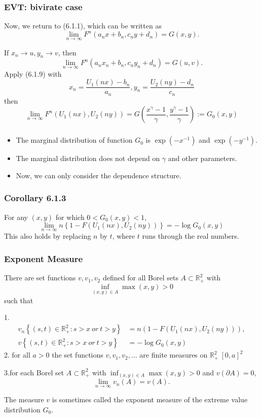 \documentclass{beamer}
\newcommand{\suit}[1]{\left(#1\right)}
\newcommand{\set}[1]{\left\{#1\right\}}
\begin{document}
\begin{frame}
    \frametitle{EVT: bivirate case}
    Now, we return to (6.1.1), which can be written as 
\begin{equation}\tag{6.1.8}
    \lim_{n \to \infty} F^n (a_n x+b_n, c_ny+d_n)=G(x,y).
\end{equation}
 
If $x_n \to u, y_n \to v$, then 
\begin{equation}\tag{6.1.9}
    \lim_{n \to \infty} F^n (a_n x_n+b_n, c_ny_n+d_n)=G(u,v).
\end{equation}
Apply (6.1.9) with 
$$
x_n=\dfrac{U_1(nx)-b_n}{a_n},y_n=\dfrac{U_2(ny)-d_n}{c_n}
$$
then 
$$
\lim_{n\to \infty} F^n (U_1(nx),U_2(ny))=G\suit{\dfrac{x^{\gamma}-1}{\gamma},\dfrac{y^{\gamma}-1}{\gamma}}:=G_0(x,y)
$$
\end{frame}


\begin{frame}
    \frametitle{}
\begin{itemize}
    \item     The marginal distribution of function $G_0$ is    $\exp(-x^{-1})$ and $\exp(-y^{-1})$.
    \bigskip
    \item The marginal distribution does not depend on $\gamma$ and other parameters.
    \bigskip
    \item Now, we can only consider the dependence structure.
\end{itemize}

    

\end{frame}

\begin{frame}
    \frametitle{Corollary 6.1.3}
For any $(x,y)$ for which $0<G_0(x,y)<1$,
\begin{equation}\tag{6.1.11 }
    \lim_{n\to \infty} n\set{1-F(U_1(nx),U_2(ny))}=-\log G_0(x,y)
\end{equation}
This also holds by replacing $n$ by $t$, where $t$ runs through the real numbers.

\end{frame}

\begin{frame}
    \frametitle{Exponent Measure}
There are set functions $v,v_1,v_2$ defined for all Borel sets $A\subset \mathbb{R}_{+}^2$ with 
$$
\inf_{(x,y)\in A}\max(x,y)>0 
$$
such that

1.
$$
\begin{aligned}
    v_n\set{(s,t)\in \mathbb{R}_{+}^2: s>x \ or \ t>y}&=n\suit{1-F(U_1(nx),U_2(ny))},\\
    v\set{(s,t)\in \mathbb{R}_{+}^2: s>x\  or \ t>y}&=-\log G_0(x,y)
\end{aligned}
$$
2. for all $a>0$ the set functions $v,v_1,v_2,\dots$ are finite measures on $\mathbb{R}_{+}^2 \ [0,a]^2$

3.for  each Borel set $ A\subset \mathbb{R}_{+}^2$ with $\inf_{(x,y)\in A}\max(x,y)>0$ and $v(\partial A)=0$,
$$
\lim_{n \to \infty} v_n(A)=v(A).
$$

The measure $v$ is sometimes called the exponent measure of the extreme value distribution $G_0$.
\end{frame}
\end{document}
